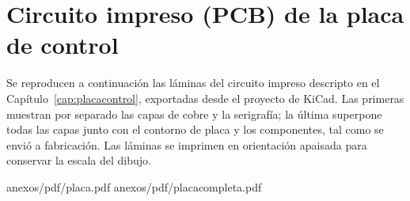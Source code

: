 \chapter{Circuito impreso (PCB) de la placa de control}
\label{anexo:pcb}

Se reproducen a continuación las láminas del circuito impreso descripto
en el Capítulo~\ref{cap:placacontrol}, exportadas desde el proyecto de
KiCad. Las primeras muestran por separado las capas de cobre y la
serigrafía; la última superpone todas las capas junto con el contorno de
placa y los componentes, tal como se envió a fabricación. Las láminas se
imprimen en orientación apaisada para conservar la escala del dibujo.

\begin{hojaapaisada}
%
  {anexos/pdf/placa.pdf}
%
  {anexos/pdf/placacompleta.pdf}
\end{hojaapaisada}
